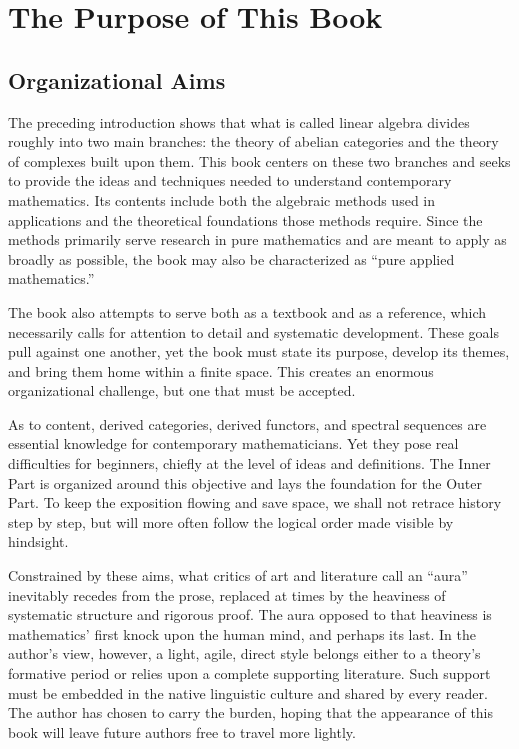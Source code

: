 
\section*{The Purpose of This Book}
\hypertarget{o014.aljabr2.prelude.book-purpose}{ }

\subsection*{Organizational Aims}

The preceding introduction shows that what is called linear algebra divides roughly into two main branches: the theory of abelian categories and the theory of complexes built upon them. This book centers on these two branches and seeks to provide the ideas and techniques needed to understand contemporary mathematics. Its contents include both the algebraic methods used in applications and the theoretical foundations those methods require. Since the methods primarily serve research in pure mathematics and are meant to apply as broadly as possible, the book may also be characterized as ``pure applied mathematics.''

The book also attempts to serve both as a textbook and as a reference, which necessarily calls for attention to detail and systematic development. These goals pull against one another, yet the book must state its purpose, develop its themes, and bring them home within a finite space. This creates an enormous organizational challenge, but one that must be accepted.

As to content, derived categories, derived functors, and spectral sequences are essential knowledge for contemporary mathematicians. Yet they pose real difficulties for beginners, chiefly at the level of ideas and definitions. The Inner Part is organized around this objective and lays the foundation for the Outer Part. To keep the exposition flowing and save space, we shall not retrace history step by step, but will more often follow the logical order made visible by hindsight.

Constrained by these aims, what critics of art and literature call an ``aura'' inevitably recedes from the prose, replaced at times by the heaviness of systematic structure and rigorous proof. The aura opposed to that heaviness is mathematics' first knock upon the human mind, and perhaps its last. In the author's view, however, a light, agile, direct style belongs either to a theory's formative period or relies upon a complete supporting literature. Such support must be embedded in the native linguistic culture and shared by every reader. The author has chosen to carry the burden, hoping that the appearance of this book will leave future authors free to travel more lightly.


